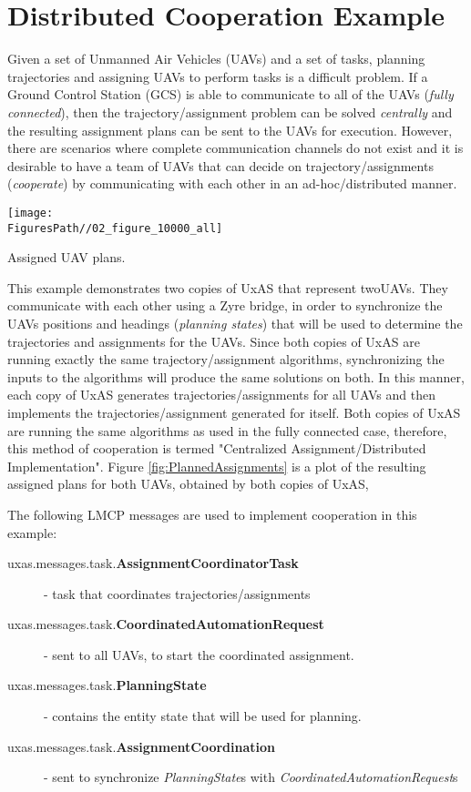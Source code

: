 
\section{Distributed Cooperation Example}

Given a set of Unmanned Air Vehicles (UAVs) and a set of tasks, planning trajectories and assigning UAVs to perform tasks is a difficult problem. If a Ground Control Station (GCS) is able to communicate to all of the UAVs (\textit{fully connected}),  then the trajectory/assignment problem can be solved \textit{centrally} and the resulting assignment plans can be sent to the UAVs for execution. However, there are scenarios where complete communication channels do not exist and it is desirable to have a team of UAVs that can decide on trajectory/assignments (\textit{cooperate}) by communicating with each other in an ad-hoc/distributed manner. 


\begin{marginfigure}
	\hspace{-35pt}\texttt{[image: \\FiguresPath//02\_figure\_10000\_all]}
	\caption{Assigned UAV plans.}
	\label{fig:PlannedAssignments}
\end{marginfigure}


This example demonstrates two copies of UxAS that represent twoUAVs. They communicate with each other using a Zyre bridge, in order to synchronize the UAVs positions and headings (\textit{planning states}) that will be used to determine the trajectories and assignments for the UAVs. Since both copies of UxAS are running exactly the same trajectory/assignment algorithms, synchronizing the inputs to the algorithms will produce the same solutions on both. In this manner, each copy of UxAS generates trajectories/assignments for all UAVs and then implements the trajectories/assignment generated for itself. Both copies of UxAS are running the same algorithms as used in the fully connected case, therefore, this method of cooperation is termed "Centralized Assignment/Distributed Implementation". Figure \ref{fig:PlannedAssignments} is a plot of the resulting assigned plans for both UAVs, obtained by both copies of UxAS, 

The following LMCP messages are used to implement cooperation in this example:
\begin{description}
\item[uxas.messages.task.\textbf{AssignmentCoordinatorTask}] - task that coordinates trajectories/assignments
\item[uxas.messages.task.\textbf{CoordinatedAutomationRequest}] - sent to all UAVs, to start the coordinated assignment.
\item[uxas.messages.task.\textbf{PlanningState}] - contains the entity state that will be used for planning.
\item[uxas.messages.task.\textbf{AssignmentCoordination}] - sent to synchronize \textit{PlanningState}s with \textit{CoordinatedAutomationRequest}s
\end{description}


